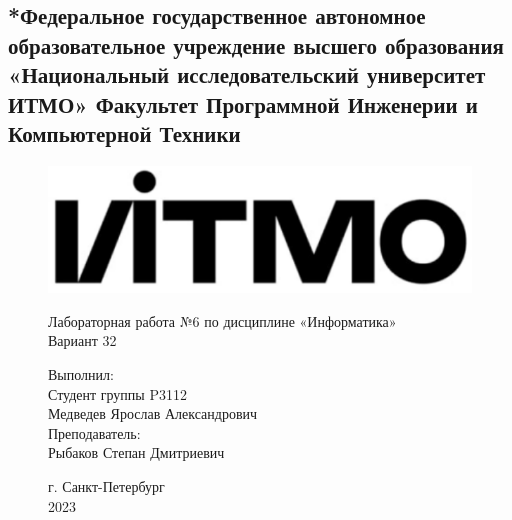\onecolumn
        \begin{center}
            \section*{*Федеральное государственное автономное образовательное учреждение  высшего образования «Национальный исследовательский университет  ИТМО» 
            Факультет Программной Инженерии и Компьютерной Техники }
        \end{center}
        \underline{\hspace{14.7cm}}
    \vfill
    \begin{figure}[!hc]
        \centering
        \includegraphics{ITMO_logo.png}
        \begin{center}\Large Лабораторная работа №6 по дисциплине «Информатика» \\Вариант 32\end{center}
    \end{figure}\par
    \vfill
    \begin{figure}[!b]
        \parbox[!b]{15 cm}{
        \begin{flushright}
            \Large
            Выполнил: \\
            Студент группы P3112\\
            Медведев Ярослав Александрович\\
            Преподаватель:\\
            Рыбаков Степан Дмитриевич\\
        \end{flushright} 
        }
        \begin{center}
            \Large
            г. Санкт-Петербург \\
            2023
        \end{center}
    \end{figure}
    \pagestyle{empty}